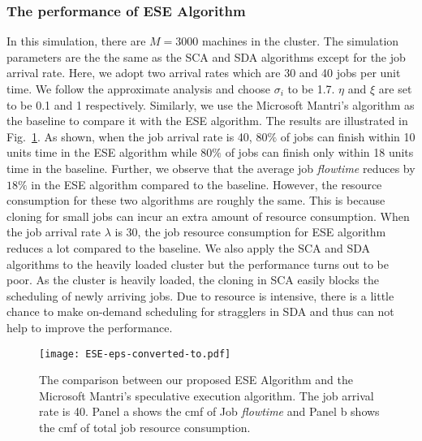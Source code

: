 \documentclass[10pt,conference]{IEEEtran}
\begin{document}
\subsubsection{The performance of ESE Algorithm}
In this simulation, there are $M  = 3000$ machines in the cluster. The simulation parameters are the the same as the SCA and SDA algorithms except for the job arrival rate. Here, we adopt two arrival rates which are 30 and 40 jobs per unit time. We follow the approximate analysis and choose $\sigma_i$ to be 1.7. $\eta$ and $\xi$ are set to be 0.1 and 1 respectively. Similarly, we use the Microsoft Mantri's algorithm as the baseline to compare it with the ESE algorithm. The results are illustrated in Fig.~\ref{ESE_40}. As shown, when the job arrival rate is 40, $80\%$ of jobs can finish within 10 units time in the ESE algorithm while $80\%$ of jobs can finish only within 18 units time in the baseline. Further, we observe that the average job \textit{flowtime} reduces by $18\%$ in the ESE algorithm compared to the baseline. However, the resource consumption for these two algorithms are roughly the same. This is because cloning for small jobs can incur an extra amount of resource consumption. When the job arrival rate $\lambda$ is 30, the job resource consumption for ESE algorithm reduces a lot compared to the baseline. We also apply the SCA and SDA algorithms to the heavily loaded cluster but the performance turns out to be poor. As the cluster is heavily loaded, the cloning in SCA easily blocks the scheduling of newly arriving jobs. Due to resource is intensive, there is a little chance to make on-demand scheduling for stragglers in SDA and thus can not help to improve the performance.

\begin{figure}
\centering
\texttt{[image: ESE-eps-converted-to.pdf]}
\caption{The comparison between our proposed ESE Algorithm and the Microsoft Mantri's speculative execution algorithm.  The job arrival rate is 40. Panel a shows the cmf of Job \textit{flowtime} and Panel b shows the cmf of total job resource consumption.}
\label{ESE_40}
\vspace{-0.3 cm}
\end{figure}
\end{document}
